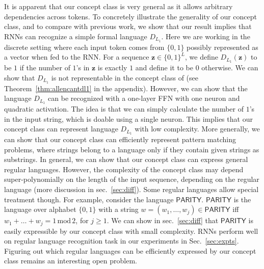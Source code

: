 It is apparent that our concept class is very general as it allows arbitrary dependencies across tokens. To concretely illustrate the generality of our concept class, and to compare with previous work, we show that our result implies that  RNNs can recognize a simple formal language $D_{L_1}$. Here we are working in the discrete setting where each input token comes from $\{0, 1\}$ possibly represented as a vector when fed to the RNN. For a sequence $\mathbf{z} \in \{0, 1\}^L$, we define $D_{L_1}(\mathbf{z})$ to be $1$ if the number of $1$'s in $\mathbf{z}$ is exactly $1$ and define it to be $0$ otherwise. We can show that $D_{L_1}$ is not representable in the concept class of \cite{allen2019can} (see Theorem~\ref{thm:allencantdl1} in the appendix).  However, we can show that the language $D_{L_1}$ can be recognized with a one-layer FFN with one neuron and quadratic activation. The idea is that we can simply calculate the number of $1$'s in the input string, which is doable using a single neuron. This implies that our concept class can represent language $D_{L_1}$ with low complexity. More generally, we can show that our concept class can efficiently represent pattern matching problems, where strings belong to a language only if they contain given strings as substrings. In general, we can show that our concept class can express general regular languages. However, the complexity of the concept class may depend super-polynomially on the length of the input sequence, depending on the regular language (more discussion in sec.~\ref{sec:diff}). Some regular languages allow special treatment though. For example, consider the language $\mathsf{PARITY}$. $\mathsf{PARITY}$ is the language over alphabet $\{0, 1\}$ with a string $w = (w_1, \ldots, w_j) \in \mathsf{PARITY}$ iff
$w_1+\ldots +w_j = 1 \,\mathrm{mod}\, 2$, for $j \geq 1$. We can show in sec.~\ref{sec:diff} that $\mathsf{PARITY}$ is easily expressible by our concept class with small complexity. RNNs perform well on regular language recognition task in our experiments in Sec.~\ref{sec:expts}. Figuring out which regular languages can be efficiently expressed by our concept class remains an interesting open problem.



